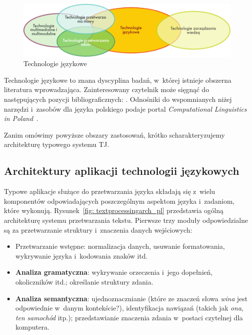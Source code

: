 \begin{multicols}{2}
\begin{figure}[htb]  \center
\includegraphics[width=\textwidth]{../_media/polish/language_technologies}
\caption{Technologie językowe} \label{fig: ltincontext_pl}
 \end{figure} 

Technologie językowe to znana dyscyplina badań, w~której istnieje
obszerna literatura wprowadzająca. Zainteresowany czytelnik może
sięgnąć do następujących pozycji bibliograficznych:
\cite{jurafsky-martin01, manning-schuetze1, lt-world1, lt-survey1,
mykowiecka1}. Odnośniki do wspomnianych niżej narzędzi i~zasobów
dla języka polskiego podaje portal \textit{Computational Linguistics
in Poland}~\cite{Clip2}. 

Zanim omówimy powyższe obszary zastosowań, krótko
scharakteryzujemy architekturę typowego systemu TJ. 

\subsection[Architektury aplikacji technologii
językowych]{Architektury aplikacji technologii językowych} Typowe
aplikacje służące do przetwarzania języka składają się z~wielu
komponentów odpowiadających poszczególnym aspektom języka
i~zadaniom, które wykonują. Rysunek~\ref{fig: textprocessingarch_pl}
przedstawia ogólną architekturę systemu przetwarzania tekstu.
Pierwsze trzy moduły odpowiedzialne są za przetwarzanie struktury
i~znaczenia danych wejściowych: 

\begin{itemize} \item Przetwarzanie wstępne: normalizacja danych,
usuwanie formatowania, wykrywanie języka i~kodowania znaków itd.
\item \textbf{Analiza gramatyczna}: wykrywanie orzeczenia i~jego
dopełnień, okoliczników itd.; określanie struktury zdania. \item
\textbf{Analiza semantyczna}: ujednoznacznianie (które ze znaczeń
słowa \emph{wina} jest odpowiednie w~danym kontekście?),
identyfikacja nawiązań (takich jak \emph{ona}, \emph{ten samochód}
itp.); przedstawianie znaczenia zdania w~postaci czytelnej dla
komputera. \end{itemize} 


\end{multicols}
